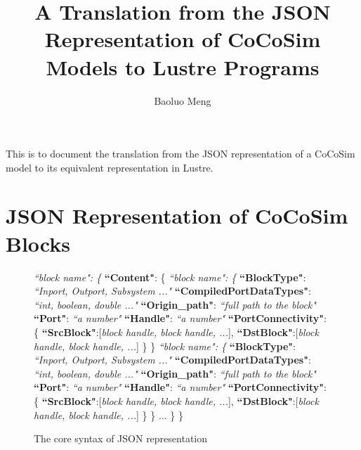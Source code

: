 \documentclass{article}
\begin{document}
\title{A Translation from the JSON Representation of CoCoSim Models to Lustre Programs}

\author{Baoluo Meng}


\maketitle

This is to document the translation from the JSON representation of a CoCoSim model to its equivalent representation in Lustre.


\section{JSON Representation of CoCoSim Blocks}
\begin{figure}
\begin{algorithmic}
\State \textit{\textsf{``block name": \{ }}
\State {\ \ \ \ } \textsf{\textbf{``Content"}: \{
\State {\ \ \ \ \ \ \ \ } \textit{``block name": \{} 
\State {\ \ \ \ \ \ \ \ \ \ \ \ } \textbf{``BlockType"}:  \textit{``Inport, Outport, Subsystem ..."} 
\State {\ \ \ \ \ \ \ \ \ \ \ \ } \textbf{``CompiledPortDataTypes"}: \textit{``int, boolean, double ..."} 
\State {\ \ \ \ \ \ \ \ \ \ \ \ } \textbf{``Origin\_path"}: \textit{``full path to the block"} 
\State {\ \ \ \ \ \ \ \ \ \ \ \ } \textbf{``Port"}: \textit{``a number"} 
\State {\ \ \ \ \ \ \ \ \ \ \ \ } \textbf{``Handle"}: \textit{``a number"} 		   
\State {\ \ \ \ \ \ \ \ \ \ \ \ } \textbf{``PortConnectivity"}: \{ 
\State {\ \ \ \ \ \ \ \ \ \ \ \ \ \ \ \ } \textbf{``SrcBlock"}:[\textit{block handle, block handle, ...}], 
\State {\ \ \ \ \ \ \ \ \ \ \ \ \ \ \ \ } \textbf{``DstBlock"}:[\textit{block handle, block handle, ...}]		
\State {\ \ \ \ \ \ \ \ \ \ \ \ }\}	
\State {\ \ \ \ \ \ \ \ } \}
\State {\ \ \ \ \ \ \ \ } \textit{``block name": \{} 
\State {\ \ \ \ \ \ \ \ \ \ \ \ } \textbf{``BlockType"}:  \textit{``Inport, Outport, Subsystem ..."} 
\State {\ \ \ \ \ \ \ \ \ \ \ \ } \textbf{``CompiledPortDataTypes"}: \textit{``int, boolean, double ..."} 
\State {\ \ \ \ \ \ \ \ \ \ \ \ } \textbf{``Origin\_path"}: \textit{``full path to the block"} 
\State {\ \ \ \ \ \ \ \ \ \ \ \ } \textbf{``Port"}: \textit{``a number"} 
\State {\ \ \ \ \ \ \ \ \ \ \ \ } \textbf{``Handle"}: \textit{``a number"} 		   
\State {\ \ \ \ \ \ \ \ \ \ \ \ } \textbf{``PortConnectivity"}: \{ 
\State {\ \ \ \ \ \ \ \ \ \ \ \ \ \ \ \ } \textbf{``SrcBlock"}:[\textit{block handle, block handle, ...}], 
\State {\ \ \ \ \ \ \ \ \ \ \ \ \ \ \ \ } \textbf{``DstBlock"}:[\textit{block handle, block handle, ...}]		
\State {\ \ \ \ \ \ \ \ \ \ \ \ }\}	
\State {\ \ \ \ \ \ \ \ } \}
\State {\ \ \ \ \ \ \ \ } $\ldots$
\State {\ \ \ \ }\}
\State \}}
\end{algorithmic}
\caption{The core syntax of JSON representation}
\label{jsonsyntax}
\end{figure}
\end{document}
